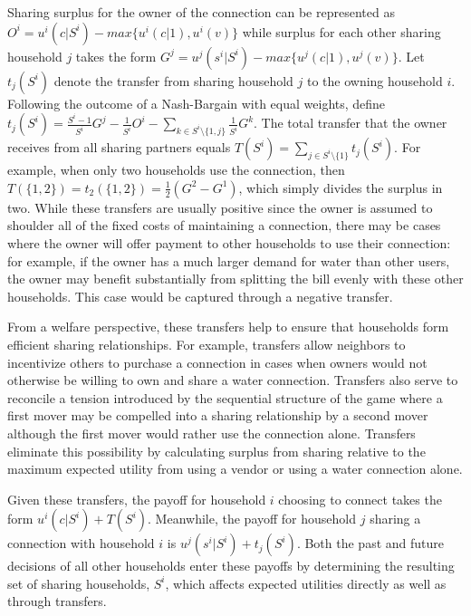 \documentclass[12pt]{article}
\begin{document}
Sharing surplus for the owner of the connection can be represented as $ O^{i} = u^{i} ( c | S^{i} ) - max \{ u^{i} (c | 1), u^{i}(v) \} $ while surplus for each other sharing household $j$ takes the form $ G^{j} = u^{j} ( s^{i} | S^{i} ) - max \{ u^{j}(c | 1), u^{j}(v) \} $.  Let $t_{j}(S^{i})$ denote the transfer from sharing household $j$ to the owning household $i$.  Following the outcome of a Nash-Bargain with equal weights, define $  t_{j}(S^{i}) = \frac{S^{i}-1}{S^{i}} G^{j}  - \frac{1}{S^i} O^{i} - \sum_{k \in  S^{i} \setminus \{ 1,j \} } \frac{1}{S^i} G^{k}  $.  The total transfer that the owner receives from all sharing partners equals $T (S^{i}) = \sum_{j \in S^{i} \setminus \{ 1 \} } t_{j} (S^{i})$.  For example, when only two households use the connection, then $T(\{1,2\}) = t_{2}(\{1,2\}) = \frac{1}{2} (G^2 - G^{1})$, which simply divides the surplus in two.  While these transfers are usually positive since the owner is assumed to shoulder all of the fixed costs of maintaining a connection, there may be cases where the owner will offer payment to other households to use their connection: for example, if the owner has a much larger demand for water than other users, the owner may benefit substantially from splitting the bill evenly with these other households.  This case would be captured through a negative transfer.  

From a welfare perspective, these transfers help to ensure that households form efficient sharing relationships.  For example, transfers allow neighbors to incentivize others to purchase a connection in cases when owners would not otherwise be willing to own and share a water connection.  Transfers also serve to reconcile a tension introduced by the sequential structure of the game where a first mover may be compelled into a sharing relationship by a second mover although the first mover would rather use the connection alone.  Transfers eliminate this possibility by calculating surplus from sharing relative to the maximum expected utility from using a vendor or using a water connection alone.  

Given these transfers, the payoff for household $i$ choosing to connect takes the form $u^{i} (c|S^{i}) + T(S^{i})$.  Meanwhile, the payoff for household $j$ sharing a connection with household $i$ is $u^{j} (s^{i}|S^{i}) + t_{j}(S^{i})$.  Both the past and future decisions of all other households enter these payoffs by determining the resulting set of sharing households, $S^{i}$, which affects expected utilities directly as well as through transfers.
\end{document}
